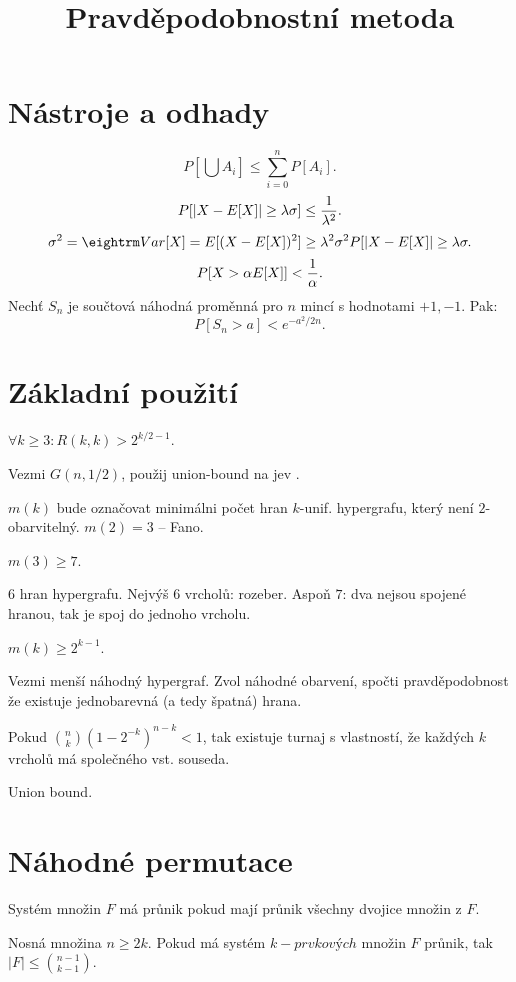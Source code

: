 

\title{Pravděpodobnostní metoda}

\section{Nástroje a odhady}

$$P[\bigcup A_i] \le \sum_{i=0}^n P[A_i].$$
$$P[|X-E[X]| \ge \lambda\sigma] \le {1 \over \lambda^2}.$$
\prf{}
$$\sigma^2 = \var[X] = E[(X - E[X])^2] \ge \lambda^2 \sigma^2 P[|X-E[X]| \ge \lambda\sigma. $$
$$P[X > \alpha E[X]] < {1 \over \alpha}.$$
 Nechť $S_n$ je součtová náhodná proměnná pro $n$ mincí s hodnotami ${+1,-1}$. Pak:
$$P[S_n > a] < e^{-a^2 / 2n}.$$

\section{Základní použití}

 $\forall k \ge 3: R(k,k) > 2^{k/2 - 1}$.

\prf{} Vezmi $G(n,1/2)$, použij union-bound na jev .

\dfn{}$m(k)$ bude označovat minimálni počet hran $k$-unif. hypergrafu, který není
$2$-obarvitelný. $m(2) = 3$ -- Fano.

\obs{} $m(3) \ge 7$.

\prf{} $6$ hran hypergrafu. Nejvýš $6$ vrcholů: rozeber. Aspoň $7$: dva nejsou spojené hranou, tak je spoj do jednoho vrcholu.

 $m(k) \ge 2^{k-1}$.

\prf{} Vezmi menší náhodný hypergraf. Zvol náhodné obarvení, spočti
pravděpodobnost že existuje jednobarevná (a tedy špatná) hrana.

\thm{} Pokud ${n \choose k} (1 - 2^{-k})^{n-k} <1$, tak existuje turnaj
s vlastností, že každých $k$ vrcholů má společného vst. souseda.

\prf{} Union bound.

\section{Náhodné permutace}

\dfn{}Systém množin $F$ {\I má průnik} pokud mají průnik všechny dvojice množin z $F$.

 Nosná množina $n \ge 2k$. Pokud má systém
$k-prvkových$ množin $F$ průnik, tak $|F| \le {n-1 \choose k-1}$.

